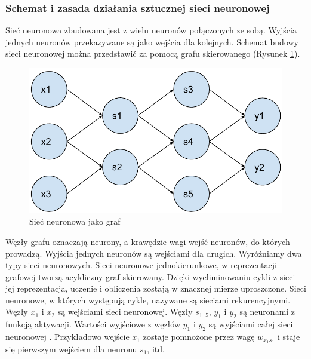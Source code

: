 \documentclass[a4paper,12pt,twoside,openany]{report}
\newcommand{\Rys}[1]{(Rysunek \ref{#1})}
\begin{document}
\subsubsection{Schemat i zasada działania sztucznej sieci neuronowej}
Sieć neuronowa zbudowana jest z wielu neuronów połączonych ze sobą.
Wyjścia jednych neuronów przekazywane są jako wejścia dla kolejnych.
Schemat budowy sieci neuronowej można przedstawić za pomocą grafu skierowanego \Rys{rys:mlp:graf}.
\begin{figure}[h]
	\centering
	\includegraphics[width=\textwidth]{ann-graf}
	\caption{Sieć neuronowa jako graf}
	\label{rys:mlp:graf}
\end{figure}
Węzły grafu oznaczają neurony, a krawędzie wagi wejść neuronów, do których prowadzą.
Wyjścia jednych neuronów są wejściami dla drugich.
Wyróżniamy dwa typy sieci neuronowych.
Sieci neuronowe jednokierunkowe, w reprezentacji grafowej tworzą acykliczny graf skierowany.
Dzięki wyeliminowaniu cykli z sieci jej reprezentacja, uczenie i obliczenia zostają w znacznej mierze uproszczone. 
Sieci neuronowe, w których występują cykle, nazywane są sieciami rekurencyjnymi.
Węzły $x_1$ i $x_2$ są wejściami sieci neuronowej.
Węzły $s_{1..5}$, $y_1$ i $y_2$ są neuronami z funkcją aktywacji.
Wartości wyjściowe z węzłów $y_1$ i $y_2$ są wyjściami całej sieci neuronowej \cite{Gurgen2017}.
Przykładowo wejście $x_1$ zostaje pomnożone przez wagę $w_{x_1s_1}$ i staje się pierwszym wejściem dla neuronu $s_1$, itd.
\end{document}
